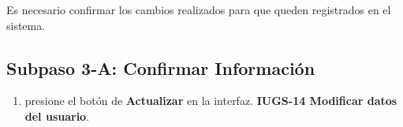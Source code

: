 	Es necesario confirmar los cambios realizados para que 
queden registrados en el sistema. 

\subsection{Subpaso 3-A: Confirmar Información}
\begin{enumerate}
	\item presione el botón de \textbf{Actualizar} en la interfaz.
		\textbf{IUGS-14 Modificar datos del usuario}.
\end{enumerate}

